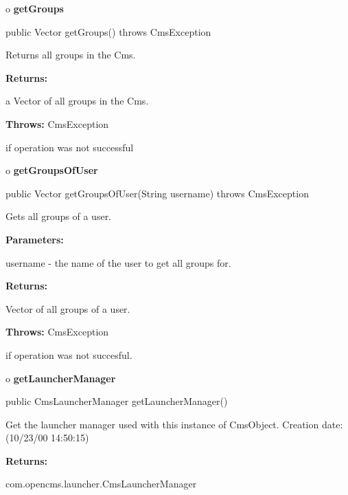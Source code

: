 o {\bf getGroups} 

\begin{PRE}
 public Vector getGroups() throws CmsException
\end{PRE}

\begin{description}
\htmlDD Returns all groups in the Cms. 

\begin{description}
\item {\bf Returns:}  

a Vector of all groups in the Cms.  
\item {\bf Throws:} CmsException  

if operation was not successful  
\end{description}

\end{description}

o {\bf getGroupsOfUser} 

\begin{PRE}
 public Vector getGroupsOfUser(String username) throws CmsException
\end{PRE}

\begin{description}
\htmlDD Gets all groups of a user. 

\begin{description}
\item {\bf Parameters:}  

username - the name of the user to get all groups for.  
\item {\bf Returns:}  

Vector of all groups of a user.  
\item {\bf Throws:} CmsException  

if operation was not succesful.  
\end{description}

\end{description}

o {\bf getLauncherManager} 

\begin{PRE}
 public CmsLauncherManager getLauncherManager()
\end{PRE}

\begin{description}
\htmlDD Get the launcher manager used with this instance of CmsObject.
Creation date: (10/23/00 14:50:15) 

\begin{description}
\item {\bf Returns:}  

com.opencms.launcher.CmsLauncherManager  
\end{description}

\end{description}

